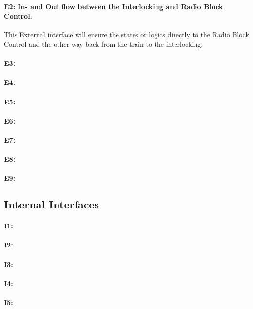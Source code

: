 \paragraph{E2: In- and Out flow between the Interlocking and Radio Block Control.}
This External interface will ensure the states or logics directly to the Radio Block Control and the other way back from the train to the interlocking.\\

\paragraph{E3:}

\paragraph{E4:}

\paragraph{E5:}

\paragraph{E6:}

\paragraph{E7:}

\paragraph{E8:}

\paragraph{E9:}

\subsection{Internal Interfaces}

\paragraph{I1:}

\paragraph{I2:}

\paragraph{I3:}

\paragraph{I4:}

\paragraph{I5:}

